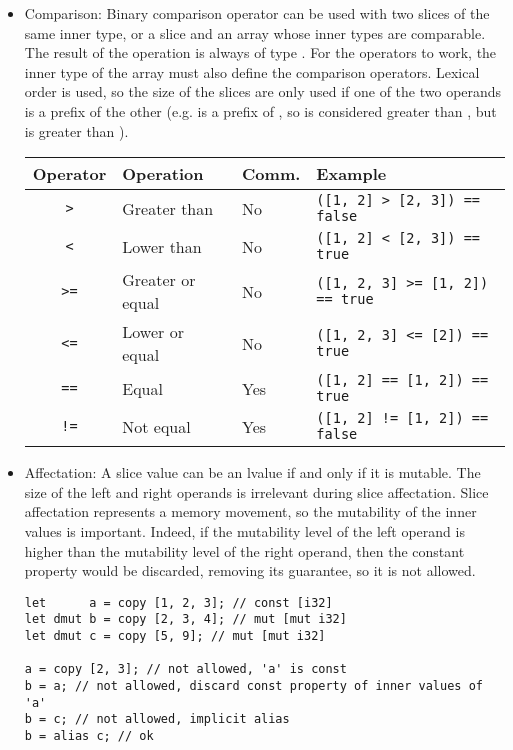 \begin{itemize}
\item Comparison: Binary comparison operator can be used with two slices of the
  same inner type, or a slice and an array whose inner types are comparable. The
  result of the operation is always of type . For the operators to
  work, the inner type of the array must also define the comparison operators.
  Lexical order is used, so the size of the slices are only used if one of the
  two operands is a prefix of the other (e.g. \token{[1, 2]} is a prefix of
  \token{[1, 2, 3]}, so \token{[1, 2, 3]} is considered greater than
  \token{[1, 2]}, but \token{[1, 3]} is greater than \token{[1, 2, 3]}).

  \begin{center}\begin{adjustbox}{max width=1.0\linewidth}
    \begin{tabular}{|c|lll|}
      \hline
      Operator & Operation & Comm. & Example\\
      \hline
      \hline
      \texttt{>}      & Greater than     & No          & \texttt{([1, 2] > [2, 3]) == false}    \\
      \texttt{<}      & Lower than       & No          & \texttt{([1, 2] < [2, 3]) == true}     \\
      \texttt{>=}     & Greater or equal & No          & \texttt{([1, 2, 3] >= [1, 2]) == true} \\
      \texttt{<=}     & Lower or equal   & No          & \texttt{([1, 2, 3] <= [2]) == true}    \\
      \texttt{==}     & Equal            & Yes         & \texttt{([1, 2] == [1, 2]) == true}    \\
      \texttt{!=}     & Not equal        & Yes         & \texttt{([1, 2] != [1, 2]) == false}   \\
      \hline
    \end{tabular}
  \end{adjustbox}\end{center}

\item Affectation: A slice value can be an lvalue if and only if it is mutable.
  The size of the left and right operands is irrelevant during slice
  affectation. Slice affectation represents a memory movement, so the mutability
  of the inner values is important. Indeed, if the mutability level of the left
  operand is higher than the mutability level of the right operand, then the
  constant property would be discarded, removing its guarantee, so it is not
  allowed.

  \begin{lstlisting}[style=coloredverbatim]
let      a = copy [1, 2, 3]; // const [i32]
let dmut b = copy [2, 3, 4]; // mut [mut i32]
let dmut c = copy [5, 9]; // mut [mut i32]

a = copy [2, 3]; // not allowed, 'a' is const
b = a; // not allowed, discard const property of inner values of 'a'
b = c; // not allowed, implicit alias
b = alias c; // ok
  \end{lstlisting}

\end{itemize}


